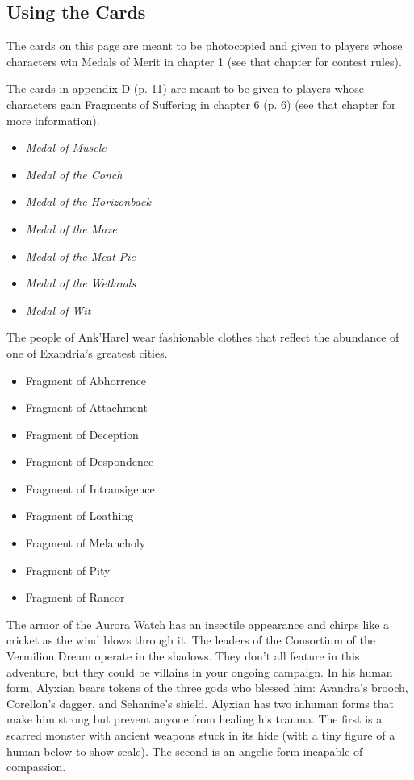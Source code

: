 \documentclass[letterpaper, 11pt, bg=full, twocolumn]{dndbook}
\begin{document}
\subsection{Using the Cards}

The cards on this page are meant to be photocopied and given to players whose characters win Medals of Merit in chapter 1 (see that chapter for contest rules).

The cards in appendix D (p. 11) are meant to be given to players whose characters gain Fragments of Suffering in chapter 6 (p. 6) (see that chapter for more information).

\begin{itemize}
\item \textit{Medal of Muscle}
\item \textit{Medal of the Conch}
\item \textit{Medal of the Horizonback}
\item \textit{Medal of the Maze}
\item \textit{Medal of the Meat Pie}
\item \textit{Medal of the Wetlands}
\item \textit{Medal of Wit}
\end{itemize}
The people of Ank'Harel wear fashionable clothes that reflect the abundance of one of Exandria's greatest cities.
\begin{itemize}
\item Fragment of Abhorrence
\item Fragment of Attachment
\item Fragment of Deception
\item Fragment of Despondence
\item Fragment of Intransigence
\item Fragment of Loathing
\item Fragment of Melancholy
\item Fragment of Pity
\item Fragment of Rancor
\end{itemize}
The armor of the Aurora Watch has an insectile appearance and chirps like a cricket as the wind blows through it.
The leaders of the Consortium of the Vermilion Dream operate in the shadows. They don't all feature in this adventure, but they could be villains in your ongoing campaign.
In his human form, Alyxian bears tokens of the three gods who blessed him: Avandra's brooch, Corellon's dagger, and Sehanine's shield.
Alyxian has two inhuman forms that make him strong but prevent anyone from healing his trauma. The first is a scarred monster with ancient weapons stuck in its hide (with a tiny figure of a human below to show scale).
The second is an angelic form incapable of compassion.
\end{document}
